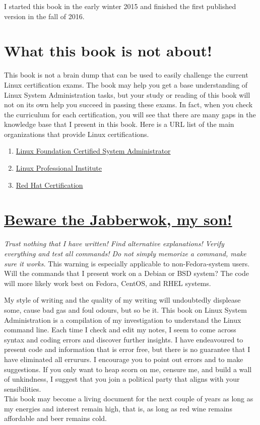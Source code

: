I started this book in the early winter 2015 and finished the first published version in the fall of 2016.

\section{What this book is not about!}

This book is not a brain dump that can be used to easily challenge the current Linux certification exams. The book may help you get a base understanding of Linux System Administration tasks, but your study or reading of this book will not on its own help you succeed in passing these exams. In fact, when you check the curriculum for each certification, you will see that there are many gaps in the knowledge base that I present in this book. Here is a URL list of the main organizations that provide Linux certifications.

\begin{enumerate}
\item{\href{https://training.linuxfoundation.org/certification/lfcs}{Linux Foundation Certified System Administrator}}
\item{\href{https://www.lpi.org/certification/}{Linux Professional Institute}}
\item{\href{https://www.redhat.com/en/services/certification}{Red Hat Certification}}
\end{enumerate}

\section{\href{http://www.poetryfoundation.org/poem/171647}{Beware the Jabberwok, my son!}}

\textit{Trust nothing that I have written! Find alternative explanations! Verify everything and test all commands! Do not simply memorize a command, make sure it works.} This warning is especially applicable to non-Fedora-system users. Will the commands that I present work on a Debian or BSD system? The code will more likely work best on Fedora, CentOS, and RHEL systems.

My style of writing and the quality of my writing will undoubtedly displease some, cause bad gas and foul odours, but so be it. This book on Linux System Administration is a compilation of my investigation to understand the  Linux command line. Each time I check and edit my notes, I seem to come across syntax and coding errors and discover further insights. I have endeavoured to present code and information that is error free, but there is no guarantee that I have eliminated all errururs. I encourage you to point out errors and to make suggestions. If you only want to heap scorn on me, censure me, and build a wall of unkindness, I suggest that you join a political party that aligns with your sensibilities.\\

This book may become a living document for the next couple of years as long as my energies and interest remain high, that is, as long as red wine remains affordable and beer remains cold.






